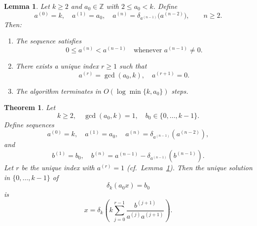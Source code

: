 \documentclass[10pt,a4paper]{amsart}
\newtheorem{lemma}{Lemma}
\newtheorem{theorem}{Theorem}
\begin{document}
\begin{lemma}\label{lem_eu}
Let $k \ge 2$ and $a_0 \in \mathbb{Z}$ with $2 \le a_0 < k$. Define
\[
a^{(0)} = k,
\quad
a^{(1)} = a_0,
\quad
a^{(n)} =
\delta_{a^{(n-1)}}\!\bigl(a^{(n-2)}\bigr),
\qquad n \ge 2.
\]
Then:
\begin{enumerate}
\item The sequence satisfies
\[
0 \le a^{(n)} < a^{(n-1)}
\quad \text{whenever } a^{(n-1)} \ne 0.
\]
\item There exists a unique index $r \ge 1$ such that
\[
a^{(r)} = \gcd(a_0,k),
\quad
a^{(r+1)} = 0.
\]
\item The algorithm terminates in $O(\log\min\{k,a_0\})$ steps.
\end{enumerate}
\end{lemma}

\begin{theorem}\label{thm:min_sol_afrc}
Let
\[
k \ge 2,
\quad
\gcd(a_0,k)=1,
\quad
b_0 \in \{0,\dots,k-1\}.
\]
Define sequences
\[
a^{(0)}=k,\quad a^{(1)}=a_0,\quad
a^{(n)}=\delta_{a^{(n-1)}}(a^{(n-2)}),
\]
and
\[
b^{(1)}=b_0,\quad
b^{(n)}=a^{(n-1)}-\delta_{a^{(n-1)}}(b^{(n-1)}).
\]
Let $r$ be the unique index with $a^{(r)}=1$ (cf.\ Lemma~\ref{lem_eu}).
Then the unique solution in $\{0,\dots,k-1\}$ of
\[
\delta_k(a_0 x)=b_0
\]
is
\[
x =
\delta_k\!\left(
k\sum_{j=0}^{r-1}
\frac{b^{(j+1)}}{a^{(j)}a^{(j+1)}}
\right).
\]
\end{theorem}
\end{document}
